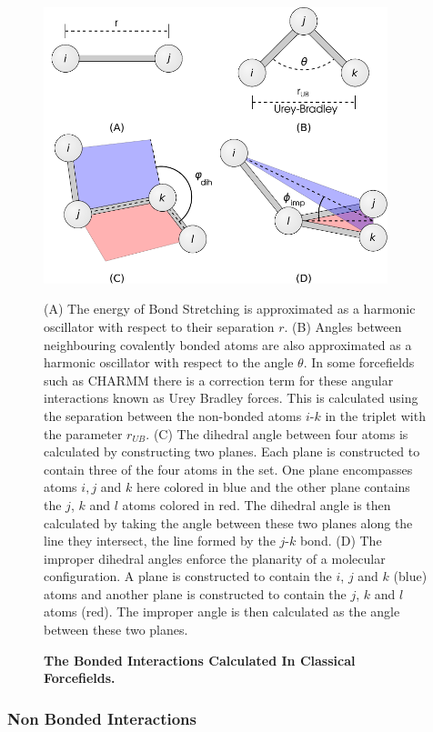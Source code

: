 \begin{figure}
	\begin{center}
	\includegraphics[width=10cm]{figures/bonded_interactions.pdf}
	\end{center}
	\captionsetup{singlelinecheck = false, justification=raggedright}
	\caption[The Bonded Interactions Calculated In Classical Forcefields]{\textbf{The Bonded Interactions Calculated In Classical Forcefields.}}{
	(A) The energy of Bond Stretching is approximated as a harmonic oscillator with respect to their separation $r$. (B) Angles between neighbouring covalently bonded atoms are also approximated as a harmonic oscillator with respect to the angle $\theta$. In some forcefields such as CHARMM there is a correction term for these angular interactions known as Urey Bradley forces. This is calculated using the separation between the non-bonded atoms $i$-$k$ in the triplet with the parameter $r_{UB}$. (C) The dihedral angle between four atoms is calculated by constructing two planes. Each plane is constructed to contain three of the four atoms in the set. One plane encompasses atoms $i, j$ and $k$ here colored in blue and the other plane contains the $j$, $k$ and $l$ atoms colored in red. The dihedral angle is then calculated by taking the angle between these two planes along the line they intersect, the line formed by the $j$-$k$ bond. (D) The improper dihedral angles enforce the planarity of a molecular configuration. A plane is constructed to contain the $i$, $j$ and $k$ (blue) atoms and another plane is constructed to contain the $j$, $k$ and $l$ atoms (red). The improper angle is then calculated as the angle between these two planes. }
	\label{charmm_bonded}
\end{figure}

\subsubsection{Non Bonded Interactions}


